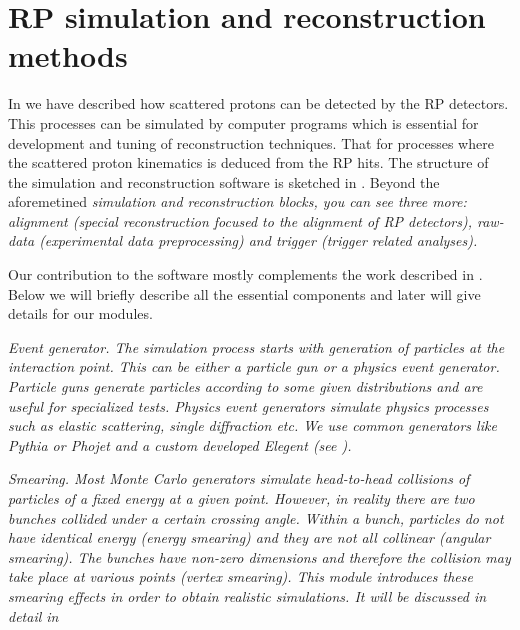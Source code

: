 \iffalse
RP, MC, IP5, CMS, T1, T2, VFAT, DIGI, RECO, LAB, LHC, LS, DPE, MC, TOTEM
\fi


\chapter{RP simulation and reconstruction methods}

In  we have described how scattered protons can be detected by the RP detectors. This processes can be simulated by computer programs which is essential for development and tuning of reconstruction techniques. That for processes where the scattered proton kinematics is deduced from the RP hits. The structure of the simulation and reconstruction software is sketched in . Beyond the aforemetined \em{simulation} and \em{reconstruction} blocks, you can see three more: \em{alignment} (special reconstruction focused to the alignment of RP detectors), \em{raw-data} (experimental data preprocessing) and \em{trigger} (trigger related analyses).


Our contribution to the software mostly complements the work described in . Below we will briefly describe all the essential components and later will give details for our modules.

\em{Event generator}.
The simulation process starts with generation of particles at the interaction point. This can be either a \em{particle gun} or a \em{physics event generator}. Particle guns generate particles according to some given distributions and are useful for specialized tests. Physics event generators simulate physics processes such as elastic scattering, single diffraction etc. We use common generators like Pythia  or Phojet  and a custom developed Elegent (see ).

\em{Smearing}.
Most Monte Carlo generators simulate head-to-head collisions of particles of a fixed energy at a given point. However, in reality there are two bunches collided under a certain crossing angle. Within a bunch, particles do not have identical energy (energy smearing) and they are not all collinear (angular smearing). The bunches have non-zero dimensions and therefore the collision may take place at various points (vertex smearing). This module introduces these smearing effects in order to obtain realistic simulations. It will be discussed in detail in 

